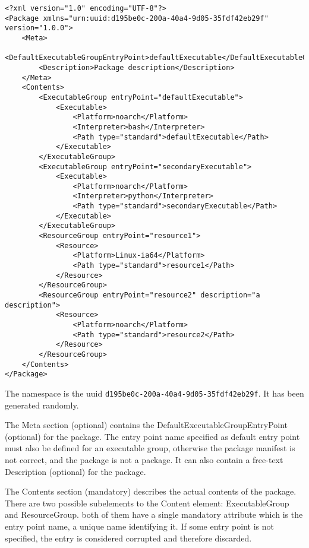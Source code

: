 \begin{verbatim}
<?xml version="1.0" encoding="UTF-8"?>
<Package xmlns="urn:uuid:d195be0c-200a-40a4-9d05-35fdf42eb29f" version="1.0.0">
    <Meta>
        <DefaultExecutableGroupEntryPoint>defaultExecutable</DefaultExecutableGroupEntryPoint>
        <Description>Package description</Description>
    </Meta>
    <Contents>
        <ExecutableGroup entryPoint="defaultExecutable">
            <Executable>
                <Platform>noarch</Platform>
                <Interpreter>bash</Interpreter>
                <Path type="standard">defaultExecutable</Path>
            </Executable>
        </ExecutableGroup>
        <ExecutableGroup entryPoint="secondaryExecutable">
            <Executable>
                <Platform>noarch</Platform>
                <Interpreter>python</Interpreter>
                <Path type="standard">secondaryExecutable</Path>
            </Executable>
        </ExecutableGroup>
        <ResourceGroup entryPoint="resource1">
            <Resource>
                <Platform>Linux-ia64</Platform>
                <Path type="standard">resource1</Path>
            </Resource>
        </ResourceGroup>
        <ResourceGroup entryPoint="resource2" description="a description">
            <Resource>
                <Platform>noarch</Platform>
                <Path type="standard">resource2</Path>
            </Resource>
        </ResourceGroup>
    </Contents>
</Package>
\end{verbatim}

The namespace is the uuid \verb+d195be0c-200a-40a4-9d05-35fdf42eb29f+. It has
been generated randomly.  

The Meta section (optional) contains the
DefaultExecutableGroupEntryPoint (optional) for the package. The entry point name
specified as default entry point must also be defined for an executable group,
otherwise the package manifest is not correct, and the package is not a
package. It can also contain a free-text Description (optional) for the package.

The Contents section (mandatory) describes the actual contents of the package. There are two
possible subelements to the Content element: ExecutableGroup and ResourceGroup.
both of them have a single mandatory attribute which is the entry point name, a
unique name identifying it. If some entry point is not specified, the entry is
considered corrupted and therefore discarded.


